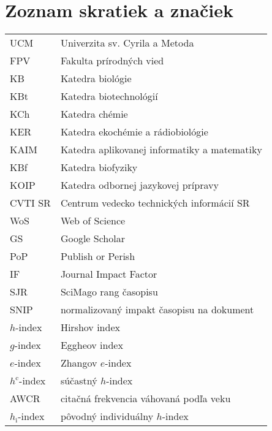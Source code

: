 \chapter*{Zoznam skratiek a značiek}

\begin{flushleft}
  \begin{longtable}[l]{ll} %
    UCM                    & Univerzita sv. Cyrila a Metoda \\[1mm]
    FPV                    & Fakulta prírodných vied \\[1mm]
    KB                     & Katedra biológie \\[1mm]
    KBt                    & Katedra biotechnológií \\[1mm]
    KCh                    & Katedra chémie \\[1mm]
    KER                    & Katedra ekochémie a rádiobiológie \\[1mm]
    KAIM                   & Katedra aplikovanej informatiky a matematiky\\[1mm]
    KBf                    & Katedra biofyziky\\[1mm]
    KOIP                   & Katedra odbornej jazykovej prípravy\\[1mm]
    CVTI SR                & Centrum vedecko technických informácií SR\\[1mm]
    WoS                    & Web of Science \\[1mm]
    GS                     & Google Scholar \\[1mm]
    PoP                    & Publish or Perish \\[1mm]
    IF                     & Journal Impact Factor \\[1mm]
    SJR                    & SciMago rang časopisu \\[1mm]
    SNIP                   & normalizovaný impakt časopisu  na dokument \\[1mm]
    $h$-index              & Hirshov index \\[1mm]
    $g$-index              & Eggheov index \\[1mm]
    $e$-index              & Zhangov $e$-index \\[1mm]
    $h^{\mathrm{c}}$-index & súčastný $h$-index \\[1mm]
    AWCR                   & citačná frekvencia váhovaná podľa veku \\[1mm]
    $h_{\mathrm{i}}$-index & pôvodný individuálny $h$-index  \\[1mm]

\end{longtable}
\end{flushleft}
